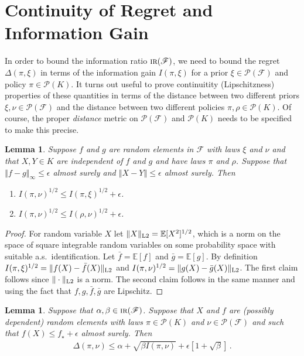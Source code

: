\documentclass[letter, 12pt]{report}
\newcommand{\norm}[1]{\left \Vert  #1 \right \Vert}
\newcommand{\Lsnorm}[1]{ \Vert  #1 \Vert_{\text{\scriptsize \textrm{L2}}}}
\newcommand{\E}{\mathbb E}
\newcommand{\sF}{\mathscr F}
\newcommand{\sP}{\mathscr P}
\newcommand{\1}{\mathbf{1}}
\newcommand{\IR}{\operatorname{\textsc{ir}}}
\theoremstyle{plain}
\newtheorem{lemma}[theorem]{Lemma}
\theoremstyle{definition}
\theoremstyle{remark}
\begin{document}
\section{Continuity of Regret and Information Gain}
In order to bound the information ratio $\IR(\sF)$, we need to bound the regret $\Delta(\pi, \xi)$
in terms of the information gain $I(\pi, \xi)$ for a prior $\xi \in \sP(\sF)$ and policy $\pi \in \sP(K)$.
It turns out useful to prove continuitity (Lipschitzness) properties of these quantities
in terms of the distance between two different priors $\xi, \nu \in \sP(\sF)$ and the distance between two different policies $\pi, \rho \in \sP(K)$.
Of course, the proper \textit{distance} metric on $\sP(\sF)$ and $\sP(K)$ needs to be specified to make this precise.
\begin{lemma}\label{lem:cont:I}
    Suppose $f$ and $g$ are random elements in $\sF$ with laws $\xi$ and $\nu$
    and that $X, Y \in K$ are independent of $f$ and $g$ and have laws $\pi$ and $\rho$.
    Suppose that
    $\norm{f - g}_\infty \leq \epsilon$ almost surely and $\norm{X - Y} \leq \epsilon$ almost surely.
    Then
    \begin{enumerate}
        \item $I(\pi, \nu)^{1/2} \leq I(\pi, \xi)^{1/2} + \epsilon$.
        \item $I(\pi, \nu)^{1/2} \leq I(\rho, \nu)^{1/2} + \epsilon$.
    \end{enumerate}
\end{lemma}

\begin{proof}
    For random variable $X$ let $\Lsnorm{X} = \E[X^2]^{1/2}$, which is a norm
    on the space of square integrable random variables on some probability space with suitable a.s.\ identification.
    Let $\bar f = \E[f]$ and $\bar g = \E[g]$.
    By definition $I(\pi, \xi)^{1/2} = \Lsnorm{f(X) - \bar f(X)}$ and $I(\pi, \nu)^{1/2} = \Lsnorm{g(X) - \bar g(X)}$.
    The first claim follows since $\Lsnorm{\cdot}$ is a norm.
    The second claim follows in the same manner and using the fact that $f, g, \bar f, \bar g$ are Lipschitz.
\end{proof}


\begin{lemma}\label{lem:ts-eps}
    Suppose that $\alpha, \beta \in \IR(\sF)$.
    Suppose that $X$ and $f$ are (possibly dependent) random elements with laws $\pi \in \sP(K)$ and $\nu \in \sP(\sF)$ and such that
    $f(X) \leq f_\star + \epsilon$ almost surely. Then
    \begin{align*}
        \Delta(\pi, \nu) \leq \alpha + \sqrt{\beta I(\pi, \nu)} + \epsilon\left[1 + \sqrt{\beta}\right]\,.
    \end{align*}
\end{lemma}
\end{document}
